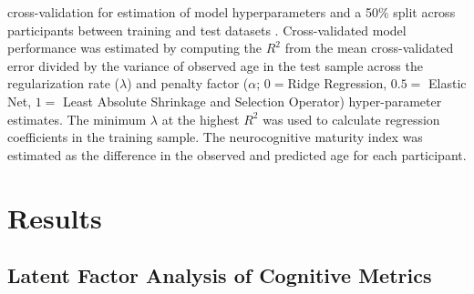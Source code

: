 \documentclass[utf8]{stylesheet}
\begin{document}
cross-validation for estimation of model hyperparameters and a 50\% split across participants between training and test datasets \citep{FriedmanHastieTibshirani2010, friedman2009glmnet}. Cross-validated model performance was estimated by computing the $R^2$ from the mean cross-validated error divided by the variance of observed age in the test sample across the regularization rate ($\lambda$) and penalty factor ($\alpha$; $0 = $Ridge Regression, $0.5 = $ Elastic Net, $1 =$ Least Absolute Shrinkage and Selection Operator) hyper-parameter estimates. The minimum $\lambda$ at the highest $R^2$ was used to calculate regression coefficients in the training sample. The neurocognitive maturity index was estimated as the difference in the observed and predicted age for each participant. 
\section{Results} 
\subsection{Latent Factor Analysis of Cognitive Metrics} 
\end{document}
